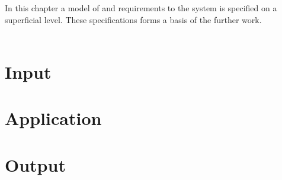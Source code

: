 In this chapter a model of and requirements to the system is specified on a superficial level. These specifications forms a basis of the further work. 
\\ \\

      
\section{Input}

\section{Application}

\section{Output}